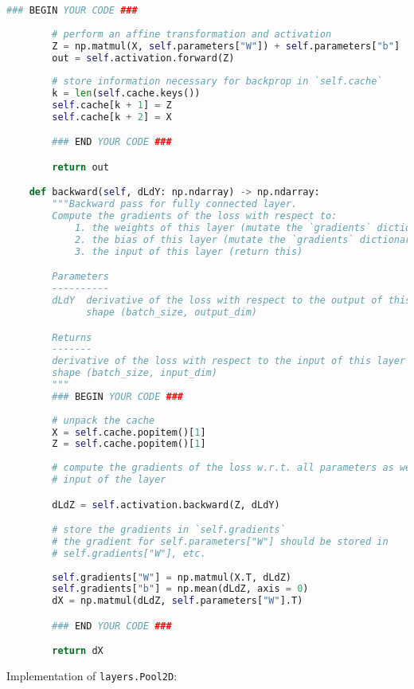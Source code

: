 \begin{lstlisting}[language=Python]
        ### BEGIN YOUR CODE ###
        
        # perform an affine transformation and activation
        Z = np.matmul(X, self.parameters["W"]) + self.parameters["b"]
        out = self.activation.forward(Z)
        
        # store information necessary for backprop in `self.cache`
        k = len(self.cache.keys())
        self.cache[k + 1] = Z
        self.cache[k + 2] = X

        ### END YOUR CODE ###

        return out

    def backward(self, dLdY: np.ndarray) -> np.ndarray:
        """Backward pass for fully connected layer.
        Compute the gradients of the loss with respect to:
            1. the weights of this layer (mutate the `gradients` dictionary)
            2. the bias of this layer (mutate the `gradients` dictionary)
            3. the input of this layer (return this)

        Parameters
        ----------
        dLdY  derivative of the loss with respect to the output of this layer
              shape (batch_size, output_dim)

        Returns
        -------
        derivative of the loss with respect to the input of this layer
        shape (batch_size, input_dim)
        """
        ### BEGIN YOUR CODE ###
        
        # unpack the cache
        X = self.cache.popitem()[1]
        Z = self.cache.popitem()[1]
        
        # compute the gradients of the loss w.r.t. all parameters as well as the
        # input of the layer

        dLdZ = self.activation.backward(Z, dLdY)

        # store the gradients in `self.gradients`
        # the gradient for self.parameters["W"] should be stored in
        # self.gradients["W"], etc.
        
        self.gradients["W"] = np.matmul(X.T, dLdZ)
        self.gradients["b"] = np.mean(dLdZ, axis = 0)
        dX = np.matmul(dLdZ, self.parameters["W"].T)

        ### END YOUR CODE ###

        return dX

\end{lstlisting}

Implementation of \texttt{layers.Pool2D}:

